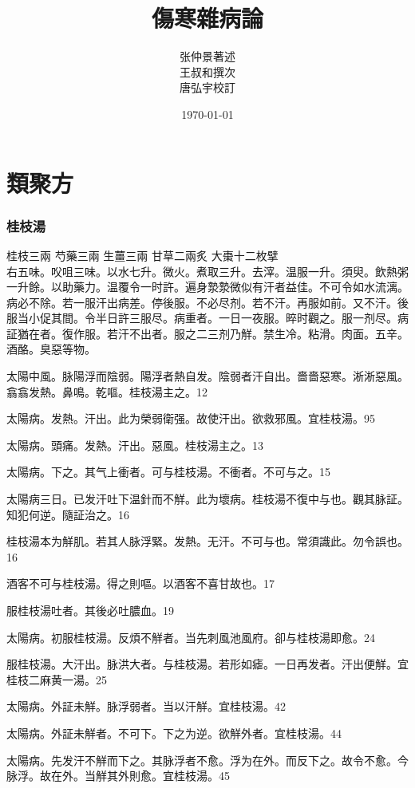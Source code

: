 \documentclass[12pt,twoside,UTF8,b5paper]{ctexbook}
\title{傷寒雜病論}
\author{张仲景著述\\王叔和撰次\\唐弘宇校訂}
\date{\today}
\begin{document}
\maketitle
\tableofcontents%

\part{類聚方}

\section{桂枝湯}

桂枝{\scriptsize 三兩} 芍藥{\scriptsize 三兩} 生薑{\scriptsize 三兩} 甘草{\scriptsize 二兩炙} 大棗{\scriptsize 十二枚擘}\\
右五味。㕮咀三味。以水七升。微火。煮取三升。去滓。温服一升。須臾。飲熱粥一升餘。以助藥力。温覆令一时許。遍身漐漐微似有汗者益佳。不可令如水流漓。病必不除。若一服汗出病差。停後服。不必尽剂。若不汗。再服如前。又不汗。後服当小促其間。令半日許三服尽。病重者。一日一夜服。晬时觀之。服一剂尽。病証猶在者。復作服。若汗不出者。服之二三剂乃觧。{禁生冷。粘滑。肉面。五辛。酒酪。臭惡等物。}

太陽中風。{脉}陽浮而陰弱。陽浮者熱自发。陰弱者汗自出。嗇嗇惡寒。淅淅惡風。翕翕发熱。鼻鳴。乾嘔。桂枝湯主之。12

太陽病。发熱。汗出。此为榮弱衛强。故使汗出。欲救邪風。宜桂枝湯。95

太陽病。頭痛。发熱。汗出。惡風。桂枝湯主之。13

太陽病。下之。其气上衝者。可与桂枝湯。不衝者。不可与之。15

太陽病三日。已发汗吐下温針而不觧。此为壞病。桂枝湯不復中与也。觀其脉証。知犯何逆。隨証治之。16

桂枝湯本为觧肌。若其人脉浮緊。发熱。无汗。不可与也。常須識此。勿令誤也。16

酒客不可与桂枝湯。得之則嘔。以酒客不喜甘故也。17

服桂枝湯吐者。其後必吐膿血。19

太陽病。初服桂枝湯。反煩不觧者。当先刺風池風府。卻与桂枝湯即愈。24

服桂枝湯。大汗出。脉洪大者。与桂枝湯。若形如瘧。一日再发者。汗出便觧。宜桂枝二麻黄一湯。25

太陽病。外証未觧。脉浮弱者。当以汗觧。宜桂枝湯。42

太陽病。外証未觧者。不可下。下之为逆。欲觧外者。宜桂枝湯。44

太陽病。先发汗不觧而下之。其脉浮者不愈。浮为在外。而反下之。故令不愈。今脉浮。故在外。当觧其外則愈。宜桂枝湯。45
\end{document}
